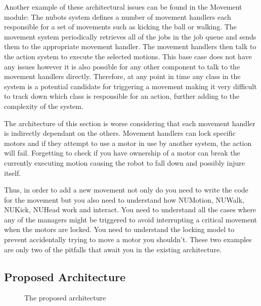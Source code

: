 \documentclass[english,12pt]{scrartcl}
\begin{document}
			Another example of these architectural issues can be found in the Movement module:
			The \gls{nubots} system defines a number of movement handlers each responsible for a set of movements such as kicking the ball or walking.
			The movement system periodically retrieves all of the jobs in the job queue and sends them to the appropriate movement handler. 
			The movement handlers then talk to the action system to execute the selected motions. 
			This base case does not have any issues however it is also possible for any other component to talk to the movement handlers directly.
			Therefore, at any point in time any class in the system is a potential candidate for triggering a movement making it very difficult to track down which class is responsible for an action, further adding to the complexity of the system.

			The architecture of this section is worse considering that each movement handler is indirectly dependant on the others.
			Movement handlers can lock specific motors and if they attempt to use a motor in use by another system, the action will fail.
			Forgetting to check if you have ownership of a motor can break the currently executing motion causing the robot to fall down and possibly injure itself.

			Thus, in order to add a new movement not only do you need to write the code for the movement
			but you also need to understand how NUMotion, NUWalk, NUKick, NUHead work and interact.
			You need to understand all the cases where any of the managers might be triggered to avoid interrupting a critical movement when the motors are locked.
			You need to understand the locking model to prevent accidentally trying to move a motor you shouldn't.
			These two examples are only two of the pitfalls that await you in the existing architecture.

			
		\subsection{Proposed Architecture}
			\begin{figure}[h]
				\centering
				\caption {The proposed architecture}
				\label{fig:HighLevelProposedArchitecture}
			\end{figure}
\end{document}
